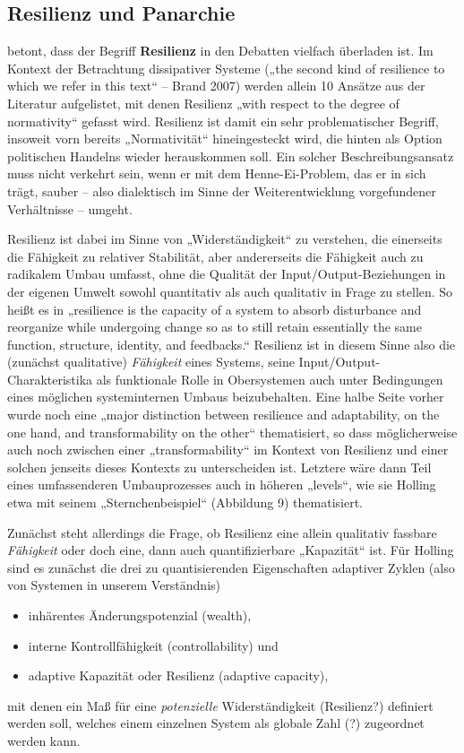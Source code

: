 \documentclass[11pt,a4paper]{article}
\begin{document}
\subsection{Resilienz und Panarchie}

\cite{Brand2007} betont, dass der Begriff \textbf{Resilienz} in den Debatten
vielfach überladen ist. Im Kontext der Betrachtung dissipativer Systeme („the
second kind of resilience to which we refer in this text“ -- Brand 2007)
werden allein 10 Ansätze aus der Literatur aufgelistet, mit denen Resilienz
„with respect to the degree of normativity“ gefasst wird. Resilienz ist damit
ein sehr problematischer Begriff, insoweit vorn bereits „Normativität“
hineingesteckt wird, die hinten als Option politischen Handelns wieder
herauskommen soll. Ein solcher Beschreibungsansatz muss nicht verkehrt sein,
wenn er mit dem Henne-Ei-Problem, das er in sich trägt, sauber -- also
dialektisch im Sinne der Weiterentwicklung vorgefundener Verhältnisse --
umgeht.

Resilienz ist dabei im Sinne von „Widerständigkeit“ zu verstehen, die
einerseits die Fähigkeit zu relativer Stabilität, aber andererseits die
Fähigkeit auch zu radikalem Umbau umfasst, ohne die Qualität der
Input/Output-Beziehungen in der eigenen Umwelt sowohl quantitativ als auch
qualitativ in Frage zu stellen. So heißt es in \cite{Walker2004} „resilience
is the capacity of a system to absorb disturbance and reorganize while
undergoing change so as to still retain essentially the same function,
structure, identity, and feedbacks.“ Resilienz ist in diesem Sinne also die
(zunächst qualitative) \emph{Fähigkeit} eines Systems, seine
Input/Output-Charakteristika als funktionale Rolle in Obersystemen auch unter
Bedingungen eines möglichen systeminternen Umbaus beizubehalten. Eine halbe
Seite vorher wurde noch eine „major distinction between resilience and
adaptability, on the one hand, and transformability on the other“
thematisiert, so dass möglicherweise auch noch zwischen einer
„transformability“ im Kontext von Resilienz und einer solchen jenseits dieses
Kontexts zu unterscheiden ist.  Letztere wäre dann Teil eines umfassenderen
Umbauprozesses auch in höheren „levels“, wie sie Holling etwa mit seinem
„Sternchenbeispiel“ (Abbildung 9) thematisiert.

Zunächst steht allerdings die Frage, ob Resilienz eine allein qualitativ
fassbare \emph{Fähigkeit} oder doch eine, dann auch quantifizierbare
„Kapazität“ ist. Für Holling sind es zunächst die drei zu quantisierenden
Eigenschaften adaptiver Zyklen (also von Systemen in unserem Verständnis)
\begin{itemize}[noitemsep]
\item inhärentes Änderungspotenzial (wealth),
\item interne Kontrollfähigkeit (controllability) und
\item adaptive Kapazität oder Resilienz (adaptive capacity),
\end{itemize}
mit denen ein Maß für eine \emph{potenzielle} Widerständigkeit (Resilienz?)
definiert werden soll, welches einem einzelnen System als globale Zahl (?)
zugeordnet werden kann.
\end{document}

